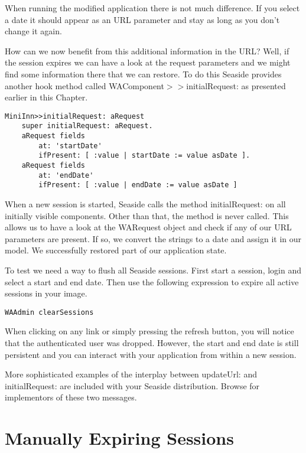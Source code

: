 \documentclass[a4paper,10pt,twoside]{book}
\newcommand{\ct}[1]{{\small\ttfamily\textup{#1}}}
\begin{document}
When running the modified application there is not much difference. If you select a date it should appear as an URL parameter and stay as long as you don't change it again.

How can we now benefit from this additional information in the URL? Well, if the session expires we can have a look at the request parameters and we might find some information there that we can restore. To do this Seaside provides another hook method called  \ct{WAComponent$>$$>$initialRequest:} as presented earlier in this Chapter.

\begin{lstlisting}
MiniInn>>initialRequest: aRequest
    super initialRequest: aRequest.
    aRequest fields
        at: 'startDate'
        ifPresent: [ :value | startDate := value asDate ].
    aRequest fields
        at: 'endDate'
        ifPresent: [ :value | endDate := value asDate ]
\end{lstlisting}

When a new session is started, Seaside calls the method \ct{initialRequest:} on all initially visible components. Other than that, the method is never called. This allows us to have a look at the  \ct{WARequest} object and check if any of our URL parameters are present. If so, we convert the strings to a date and assign it in our model. We successfully restored part of our application state.

To test we need a way to flush all Seaside sessions. First start a session, login and select a start and end date. Then use the following expression to expire all active sessions in your image.

\begin{lstlisting}
WAAdmin clearSessions
\end{lstlisting}

When clicking on any link or simply pressing the refresh button, you will notice that the authenticated user was dropped. However, the start and end date is still persistent and you can interact with your application from within a new session.

More sophisticated examples of the interplay between \ct{updateUrl:} and \ct{initialRequest:} are included with your Seaside distribution. Browse for implementors of these two messages.

\section{Manually Expiring Sessions}
\label{book:inaction:session:manuallyexpire}
\end{document}
